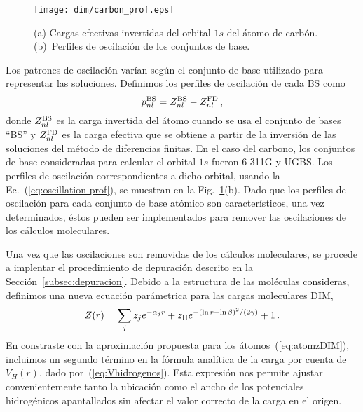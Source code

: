 \begin{figure}[t]
\centering
\texttt{[image: dim/carbon\_prof.eps]}
\caption[Inversión de funciones de onda descritas con conjuntos de base.]
{(a) Cargas efectivas invertidas del orbital $1s$ del átomo de carbón.
(b)~Perfiles de oscilación de los conjuntos de base.}
\label{fig:1sCarbon}
\end{figure}

Los patrones de oscilación varían según el conjunto de base utilizado
para representar las soluciones. Definimos los perfiles de oscilación
de cada BS como
\begin{equation}
 p_{nl}^{\mbox{\scriptsize BS}} = Z_{nl}^{\mbox{\scriptsize BS}}-
 Z_{nl}^{\mbox{\scriptsize FD}} \,,
 \label{eq:oscillation-prof}
\end{equation}
donde $Z_{nl}^{\mbox{\scriptsize BS}}$ es la carga invertida del átomo
cuando se usa el conjunto de bases ``BS'' y 
$Z_{nl}^{\mbox{\scriptsize FD}}$ es la carga efectiva que se obtiene a 
partir de la inversión de las soluciones del método de diferencias 
finitas. En el caso del carbono, los conjuntos de base consideradas para 
calcular el orbital $1s$ fueron \mbox{6-311G} y UGBS. Los perfiles de 
oscilación correspondientes a dicho orbital, usando la 
Ec.~(\ref{eq:oscillation-prof}), se muestran en la 
Fig.~\ref{fig:1sCarbon}(b). Dado que los perfiles de oscilación para 
cada conjunto de base atómico son característicos, una vez determinados, 
éstos pueden ser implementados para remover las oscilaciones de los 
cálculos moleculares. 

Una vez que las oscilaciones son removidas de los cálculos moleculares, 
se procede a implentar el procedimiento de depuración descrito en la
Sección~\ref{subsec:depuracion}. Debido a la estructura de las moléculas 
consideras, definimos una nueva ecuación parámetrica para las cargas 
moleculares DIM,
\begin{eqnarray}
 Z(r) = \sum_j z_j e^{-\alpha_j r} 
 + z_{\mbox{\scriptsize H}} e^{-(\ln r - \ln \beta)^2/(2\gamma)} 
 + 1\,.
 \label{eq:molzDIM}
\end{eqnarray}
En constraste con la aproximación propuesta para los 
átomos~(\ref{eq:atomzDIM}), incluimos un segundo término en la fórmula 
analítica de la carga por cuenta de $V_H(r)$, dado 
por~(\ref{eq:Vhidrogenos}). Esta expresión nos permite ajustar 
convenientemente tanto la ubicación como el ancho de los potenciales 
hidrogénicos apantallados sin afectar el valor correcto de la carga en 
el origen.

